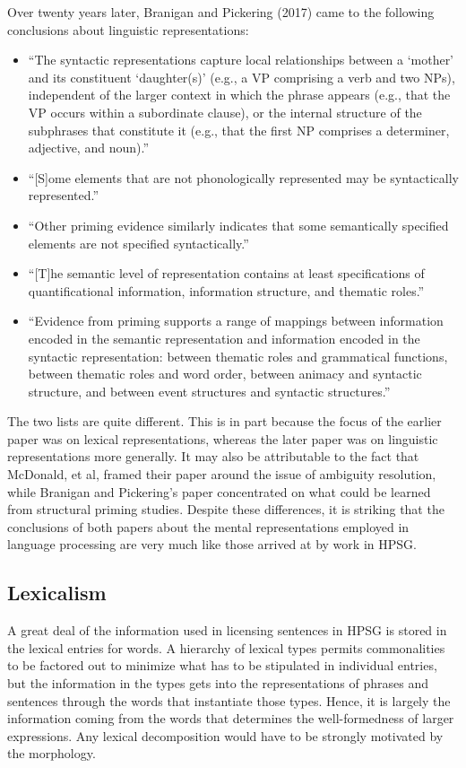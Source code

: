 \documentclass[a4paper]{article}
\begin{document}
Over twenty years later, Branigan and Pickering (2017) came to the following conclusions about linguistic representations:
\begin{itemize}
\item ``The syntactic representations capture local relationships
between a `mother' and its constituent `daughter(s)' (e.g.,
a VP comprising a verb and two NPs), independent of the
larger context in which the phrase appears (e.g., that the VP
occurs within a subordinate clause), or the internal structure
of the subphrases that constitute it (e.g., that the
first NP comprises a determiner, adjective, and noun).''
\item ``[S]ome elements that are not phonologically represented may
be syntactically represented.''
\item ``Other priming evidence similarly indicates that some
semantically specified elements are not specified syntactically.''
\item ``[T]he semantic level of representation
contains at least specifications of quantificational information,
information structure, and thematic roles.''
\item ``Evidence
from priming supports a range of mappings between information encoded in the semantic representation and information encoded in the syntactic representation: between
thematic roles and grammatical functions, between thematic roles and word order, between animacy and syntactic
structure, and between event structures and syntactic
structures.''
\end{itemize}
The two lists are quite different.  This is in part because the focus of the earlier paper was on lexical representations, whereas the later paper was on linguistic representations more generally.  It may also be attributable to the fact that McDonald, et al, framed their paper around the issue of ambiguity resolution, while Branigan and Pickering's paper concentrated on what could be learned from structural priming studies.  Despite these differences, it is striking that the conclusions of both papers about the mental representations employed in language processing are very much like those arrived at by work in HPSG.

\subsection{Lexicalism}

A great deal of the information used in licensing sentences in HPSG is stored in the lexical entries for words.  A hierarchy of lexical types permits commonalities to be factored out to minimize what has to be stipulated in individual entries, but the information in the types gets into the representations of phrases and sentences through the words that instantiate those types. Hence, it is largely the information coming from the words that determines the well-formedness of larger expressions.  Any lexical decomposition would have to be strongly motivated by the morphology.
\end{document}
